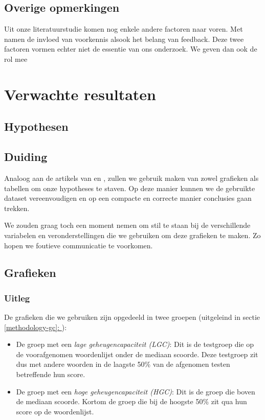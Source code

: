 \documentclass{hogent-article}
\newcommand{\customref}[1]{\underline{\ref{#1}: \nameref{#1}}}
\begin{document}
\subsection{Overige opmerkingen}
Uit onze literatuurstudie komen nog enkele andere factoren naar voren. Met namen de invloed van voorkennis alsook het belang van feedback. Deze twee factoren vormen echter niet de essentie van ons onderzoek. We geven dan ook de rol mee 

\section{Verwachte resultaten}

\subsection{Hypothesen}

\subsection{Duiding}

Analoog aan de artikels van \cite{HenryRoediger2006} en \cite{Agarwal2008}, zullen we gebruik maken van zowel grafieken als tabellen om onze hypotheses te staven. Op deze manier kunnen we de gebruikte dataset vereenvoudigen en op een compacte en correcte manier conclusies gaan trekken.\\
\par
\noindent
We zouden graag toch een moment nemen om stil te staan bij de verschillende variabelen en veronderstellingen die we gebruiken om deze grafieken te maken. Zo hopen we foutieve communicatie te voorkomen.

\subsection{Grafieken}
\subsubsection{Uitleg}
De grafieken die we gebruiken zijn opgedeeld in twee groepen (uitgeleind in sectie \customref{methodology-gc}):
\begin{itemize}
	\item De groep met een \textit{lage geheugencapaciteit (LGC)}: Dit is de testgroep die op de voorafgenomen woordenlijst onder de mediaan scoorde. Deze testgroep zit dus met andere woorden in de laagste 50\% van de afgenomen testen betreffende hun score.
	\item De groep met een \textit{hoge geheugencapaciteit (HGC)}: Dit is de groep die boven de mediaan scoorde. Kortom de groep die bij de hoogste 50\% zit qua hun score op de woordenlijst.
\end{itemize}
\end{document}
